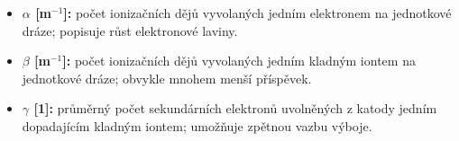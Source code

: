 \begin{itemize}
\item \textbf{$\alpha$ [m$^{-1}$]:} počet ionizačních dějů vyvolaných jedním elektronem na jednotkové dráze; popisuje růst elektronové laviny.
\item \textbf{$\beta$ [m$^{-1}$]:} počet ionizačních dějů vyvolaných jedním kladným iontem na jednotkové dráze; obvykle mnohem menší příspěvek.
\item \textbf{$\gamma$ [1]:} průměrný počet sekundárních elektronů uvolněných z katody jedním dopadajícím kladným iontem; umožňuje zpětnou vazbu výboje.
\end{itemize}
